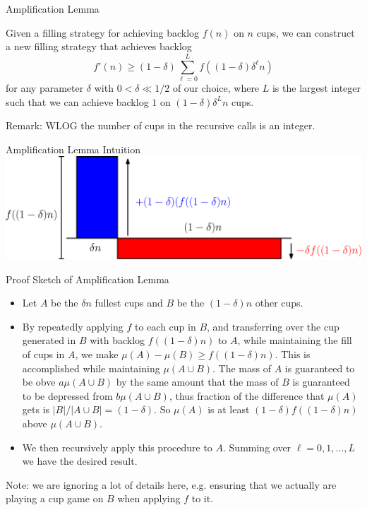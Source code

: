 \documentclass[xcolor=x11names, svgnames, rgb]{beamer}
\begin{document}
\begin{frame}[t]{Amplification Lemma}
  \begin{lemma}
    Given a filling strategy for achieving backlog $f(n)$ on $n$ cups, we can construct a new filling strategy that achieves backlog 
    $$f'(n) \ge (1-\delta)\sum_{\ell=0}^L f((1-\delta)\delta^\ell n)$$
    for any parameter $\delta$ with $0 < \delta \ll 1/2$ of our choice, where $L$
    is the largest integer such that we can achieve backlog $1$ on
    $(1-\delta)\delta^Ln$ cups.%
  \end{lemma}
  Remark: WLOG the number of cups in the recursive calls is an integer.
  
\end{frame}

\begin{frame}[t]{Amplification Lemma Intuition}
  \vspace{1.5cm}
  \includegraphics[width=\linewidth]{amplificationImgs/delta_one_minus_delta.eps}
\end{frame}

\begin{frame}[t]{Proof Sketch of Amplification Lemma}
  \begin{itemize}
    \item Let $A$ be the $\delta n$ fullest cups and $B$ be the $(1-\delta)n$ other cups.
    \item By repeatedly applying $f$ to each cup in $B$, and transferring over
      the cup generated in $B$ with backlog $f((1-\delta)n)$ to $A$, while maintaining the fill of cups in $A$, we make
      $\mu (A) - \mu (B) \ge f((1-\delta)n)$. This is accomplished while
      maintaining $\mu(A\cup B)$. The mass of $A$ is guaranteed to be obve
      $a\mu(A\cup B)$ by the same amount that the mass of $B$ is guaranteed to
      be depressed from $b\mu(A\cup B)$, thus fraction of the difference that
      $\mu(A)$ gets is $|B|/|A\cup B| = (1-\delta)$. So $\mu(A)$ is at least
      $(1-\delta)f((1-\delta)n)$ above $\mu(A\cup B)$.
    \item We then recursively apply this procedure to $A$. Summing over $\ell = 0,1, \ldots, L$ we have the desired result.
  \end{itemize} 

  Note: we are ignoring a lot of details here, e.g. ensuring that we actually are playing a cup game on $B$ when applying $f$ to it.
\end{frame}
\end{document}
